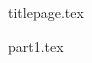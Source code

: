 %






	{titlepage.tex}
	\tableofcontents
	\newpage
	\listoffigures
	\newpage
	\listoflistings
	\newpage

	\newpage
	{part1.tex}
%	
%	

